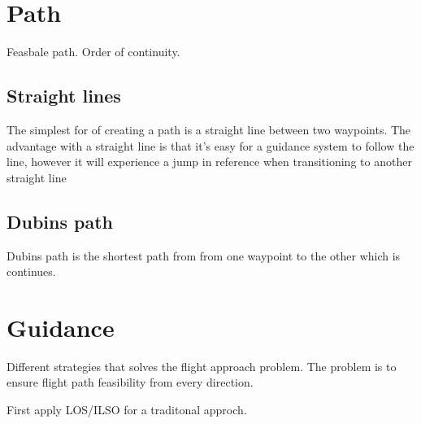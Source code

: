 \section{Path}
Feasbale path. Order of continuity.

\subsection{Straight lines}
The simplest for of creating a path is a straight line between two waypoints. The advantage with a straight line is that it's easy for a guidance system to follow the line, however it will experience a jump in reference when transitioning to another straight line
\subsection{Dubins path}
Dubins path is the shortest path from from one waypoint to the other which is continues.
\section{Guidance}
Different strategies that solves the flight approach problem. The problem is to ensure flight path feasibility from every direction.

First apply LOS/ILSO for a traditonal approch. 